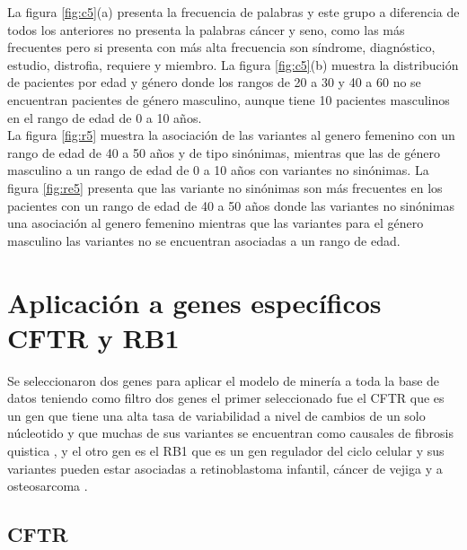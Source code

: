 La figura \ref{fig:c5}(a) presenta la frecuencia de palabras y este grupo a diferencia de todos los anteriores no presenta la palabras cáncer y seno, como las más frecuentes pero si presenta con más alta frecuencia son síndrome, diagnóstico, estudio, distrofia, requiere y miembro. La figura \ref{fig:c5}(b) muestra la distribución de pacientes por edad y género donde los rangos de 20 a 30 y 40 a 60 no se encuentran pacientes de género masculino, aunque tiene 10 pacientes masculinos en el rango de edad de 0 a 10 años. \\


La figura \ref{fig:r5} muestra la asociación de las variantes al genero femenino con un rango de edad de 40 a 50 años y de tipo sinónimas, mientras que las de género masculino  a un rango de edad de 0 a 10 años con variantes no sinónimas. La figura \ref{fig:re5} presenta que las variante no sinónimas son más frecuentes en los pacientes con un rango de edad de 40 a 50 años donde las variantes no sinónimas una asociación al genero femenino mientras que las variantes para el género masculino las variantes no se encuentran asociadas a un rango de edad. 


\section{Aplicación a genes específicos CFTR y RB1}

Se seleccionaron dos genes para aplicar el modelo de minería a toda la base de datos teniendo como filtro dos genes el primer  seleccionado fue el  CFTR que es un gen que tiene una alta tasa de variabilidad a nivel de cambios de un solo núcleotido y que muchas de sus variantes se encuentran como causales de fibrosis quistica \cite{Rowntree2003,Terlizzi2017b,Farrell2016}, y el otro gen es el RB1 que es un gen regulador del ciclo celular y sus variantes pueden estar asociadas a retinoblastoma  infantil, cáncer de vejiga y a osteosarcoma \cite{Liu2016}. \\

\subsection*{CFTR}

